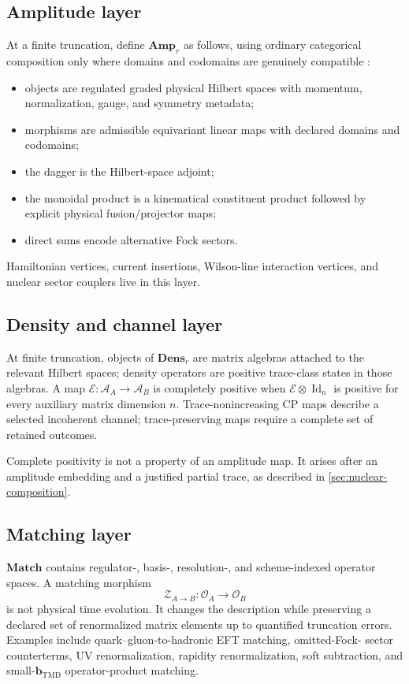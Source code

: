 \documentclass[11pt]{article}
\newcommand{\bM}{\bm{b}_{\mathrm{TMD}}}
\newcommand{\Id}{\operatorname{Id}}
\newcommand{\Alg}{\mathcal A}
\newcommand{\Amp}{\mathbf{Amp}}
\newcommand{\Dens}{\mathbf{Dens}}
\newcommand{\Match}{\mathbf{Match}}
\newcommand{\cO}{\mathcal O}
\newcommand{\cE}{\mathcal E}
\newcommand{\cZ}{\mathcal Z}
\begin{document}
\subsection{Amplitude layer}

At a finite truncation, define \(\Amp_r\) as follows, using ordinary categorical composition only where domains and codomains are genuinely compatible \cite{MacLane1998,Selinger2007}:
\begin{itemize}
\item objects are regulated graded physical Hilbert spaces with momentum,
normalization, gauge, and symmetry metadata;
\item morphisms are admissible equivariant linear maps with declared domains
and codomains;
\item the dagger is the Hilbert-space adjoint;
\item the monoidal product is a kinematical constituent product followed by
explicit physical fusion/projector maps;
\item direct sums encode alternative Fock sectors.
\end{itemize}
Hamiltonian vertices, current insertions, Wilson-line interaction vertices,
and nuclear sector couplers live in this layer.

\subsection{Density and channel layer}

At finite truncation, objects of \(\Dens_r\) are matrix algebras attached to the relevant Hilbert spaces; density operators are positive trace-class states in those algebras.  A map
\(\cE:\Alg_A\to\Alg_B\) is completely positive when
\(\cE\otimes\Id_n\) is positive for every auxiliary matrix dimension
\(n\).  Trace-nonincreasing CP maps describe a selected incoherent channel;
trace-preserving maps require a complete set of retained outcomes.

Complete positivity is not a property of an amplitude map.  It arises after
an amplitude embedding and a justified partial trace, as described in
\cref{sec:nuclear-composition}.

\subsection{Matching layer}

\(\Match\) contains regulator-, basis-, resolution-, and scheme-indexed
operator spaces.  A matching morphism
\begin{equation}
 \cZ_{A\to B}:\cO_A\longrightarrow\cO_B
\label{eq:generic-matching-map}
\end{equation}
is not physical time evolution.  It changes the description while preserving
a declared set of renormalized matrix elements up to quantified truncation
errors.  Examples include quark--gluon-to-hadronic EFT matching, omitted-Fock-
sector counterterms, UV renormalization, rapidity renormalization, soft
subtraction, and small-\(\bM\) operator-product matching.
\end{document}
